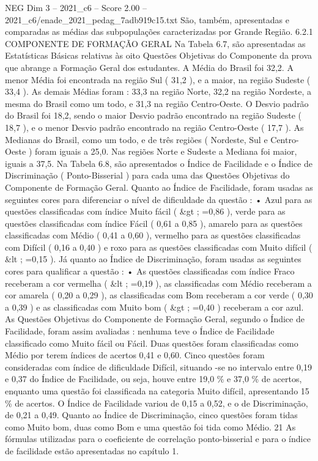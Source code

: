 \begin{textsample}{NEG Dim 3 – 2021\_c6 – Score 2.00 – 2021\_c6/enade\_2021\_pedag\_7adb919c15.txt}
São, também, apresentadas e comparadas as médias das subpopulações caracterizadas por Grande Região. 6.2.1 COMPONENTE DE FORMAÇÃO GERAL Na Tabela 6.7, são apresentadas as Estatísticas Básicas relativas às oito Questões Objetivas do Componente da prova que abrange a Formação Geral dos estudantes.
A Média do Brasil foi 32,2.
A menor Média foi encontrada na região Sul ( 31,2 ), e a maior, na região Sudeste ( 33,4 ).
As demais Médias foram : 33,3 na região Norte, 32,2 na região Nordeste, a mesma do Brasil como um todo, e 31,3 na região Centro-Oeste.
O Desvio padrão do Brasil foi 18,2, sendo o maior Desvio padrão encontrado na região Sudeste ( 18,7 ), e o menor Desvio padrão encontrado na região Centro-Oeste ( 17,7 ).
As Medianas do Brasil, como um todo, e de três regiões ( Nordeste, Sul e Centro-Oeste ) foram iguais a 25,0.
Nas regiões Norte e Sudeste a Mediana foi maior, iguais a 37,5.
Na Tabela 6.8, são apresentados o Índice de Facilidade e o Índice de Discriminação ( Ponto-Bisserial ) para cada uma das Questões Objetivas do Componente de Formação Geral.
Quanto ao Índice de Facilidade, foram usadas as seguintes cores para diferenciar o nível de dificuldade da questão : • Azul para as questões classificadas com índice Muito fácil ( \&gt ; =0,86 ), verde para as questões classificadas com índice Fácil ( 0,61 a 0,85 ), amarelo para as questões classificadas com Médio ( 0,41 a 0,60 ), vermelho para as questões classificadas com Difícil ( 0,16 a 0,40 ) e roxo para as questões classificadas com Muito difícil ( \&lt ; =0,15 ).
Já quanto ao Índice de Discriminação, foram usadas as seguintes cores para qualificar a questão : • As questões classificadas com índice Fraco receberam a cor vermelha ( \&lt ; =0,19 ), as classificadas com Médio receberam a cor amarela ( 0,20 a 0,29 ), as classificadas com Bom receberam a cor verde ( 0,30 a 0,39 ) e as classificadas com Muito bom ( \&gt ; =0,40 ) receberam a cor azul.
As Questões Objetivas do Componente de Formação Geral, segundo o Índice de Facilidade, foram assim avaliadas : nenhuma teve o Índice de Facilidade classificado como Muito fácil ou Fácil.
Duas questões foram classificadas como Médio por terem índices de acertos 0,41 e 0,60.
Cinco questões foram consideradas com índice de dificuldade Difícil, situando -se no intervalo entre 0,19 e 0,37 do Índice de Facilidade, ou seja, houve entre 19,0 \% e 37,0 \% de acertos, enquanto uma questão foi classificada na categoria Muito difícil, apresentando 15 \% de acertos.
O Índice de Facilidade variou de 0,15 a 0,52, e o de Discriminação, de 0,21 a 0,49.
Quanto ao Índice de Discriminação, cinco questões foram tidas como Muito bom, duas como Bom e uma questão foi tida como Médio. 21 As fórmulas utilizadas para o coeficiente de correlação ponto-bisserial e para o índice de facilidade estão apresentadas no capítulo 1.

\end{textsample}
